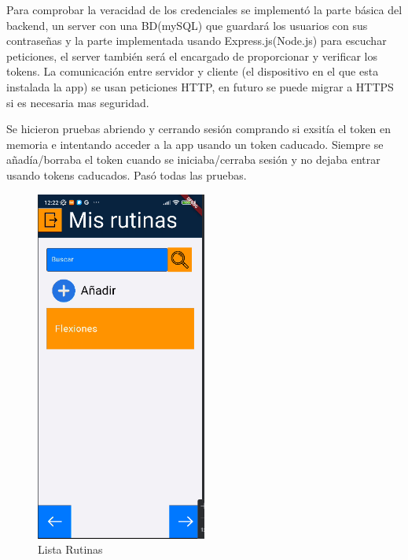 Para comprobar la veracidad de los credenciales se implementó la parte básica del backend, un server con una BD(mySQL) que guardará los usuarios con sus contraseñas y la parte implementada usando Express.js(Node.js) para escuchar peticiones, el server también será el encargado de proporcionar y verificar los tokens. La comunicación entre servidor y cliente (el dispositivo en el que esta instalada la app) se usan peticiones HTTP, en futuro se puede migrar a HTTPS si es necesaria mas seguridad.

Se hicieron pruebas abriendo y cerrando sesión comprando si exsitía el token en memoria e intentando acceder a la app usando un token caducado. Siempre se añadía/borraba el token cuando se iniciaba/cerraba sesión y no dejaba entrar usando tokens caducados. Pasó todas las pruebas.


\begin{figure}[H]
   \centering
    \includegraphics[width=0.5\textwidth]{pantallas/listaRutinas.png}
    \caption{Lista Rutinas}
    \label{fig:listaRutinas}
\end{figure}

